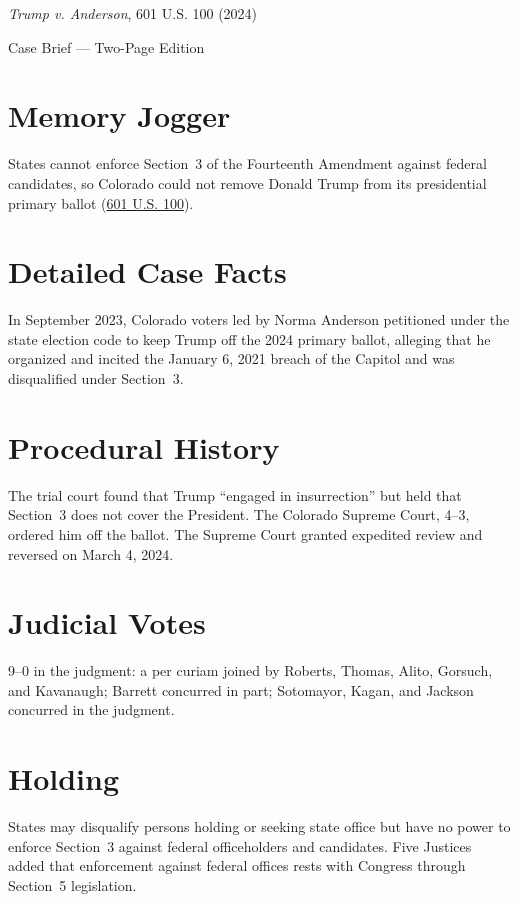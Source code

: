 \documentclass[12pt]{article}
\begin{document}
\begin{center}
{\LARGE \textit{Trump v. Anderson}, 601 U.S. 100 (2024)\par}
\vspace{0.5em}
{\large Case Brief --- Two-Page Edition\par}
\end{center}

\section{Memory Jogger}
States cannot enforce Section~3 of the Fourteenth Amendment against federal candidates, so Colorado could not remove Donald Trump from its presidential primary ballot (\href{https://www.supremecourt.gov/opinions/23pdf/601us1r06_m6hn.pdf}{601 U.S. 100}).

\section{Detailed Case Facts}
In September 2023, Colorado voters led by Norma Anderson petitioned under the state election code to keep Trump off the 2024 primary ballot, alleging that he organized and incited the January 6, 2021 breach of the Capitol and was disqualified under Section~3.

\section{Procedural History}
The trial court found that Trump ``engaged in insurrection'' but held that Section~3 does not cover the President. The Colorado Supreme Court, 4--3, ordered him off the ballot. The Supreme Court granted expedited review and reversed on March 4, 2024.

\section{Judicial Votes}
9--0 in the judgment: a per curiam joined by Roberts, Thomas, Alito, Gorsuch, and Kavanaugh; Barrett concurred in part; Sotomayor, Kagan, and Jackson concurred in the judgment.

\section{Holding}
States may disqualify persons holding or seeking state office but have no power to enforce Section~3 against federal officeholders and candidates. Five Justices added that enforcement against federal offices rests with Congress through Section~5 legislation.
\end{document}
